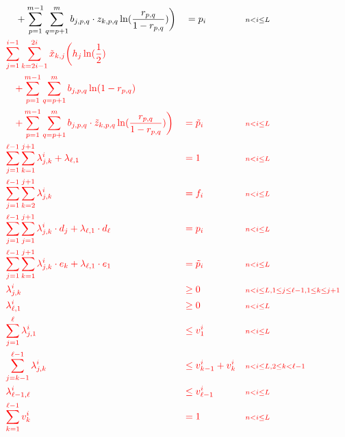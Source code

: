 \documentclass[runningheads]{llncs}
\newcommand{\HL}[1]{\textcolor{red}{#1}}
\begin{document}
\begin{align*}
                 & \quad + \sum_{p=1}^{m-1}\sum_{q=p+1}^m  b_{j,p,q} \cdot z_{k,p,q} \ln(\frac{r_{p,q}}{1-r_{p,q}}) \bigg) && = p_i && {\scriptstyle n < i \leq L}\\
                 & \HL{\sum^{i-1}_{j=1}\sum_{k=2i-1}^{2i}\tilde{x}_{k,j}\bigg(h_j\ln(\frac{1}{2})}\\
                 & \HL{\quad + \sum_{p=1}^{m-1}\sum_{q=p+1}^m b_{j,p,q}\ln(1-r_{p,q})}\\
                 & \HL{\quad + \sum_{p=1}^{m-1}\sum_{q=p+1}^m  b_{j,p,q} \cdot \tilde{z}_{k,p,q} \ln(\frac{r_{p,q}}{1-r_{p,q}}) \bigg)} && \HL{= \tilde{p}_i} && \HL{\scriptstyle n < i \leq L}\\
                 & \HL{\sum_{j=1}^{\ell-1} \sum_{k=1}^{j+1} \lambda^i_{j,k} + \lambda_{\ell,1}} && \HL{= 1}   && \HL{\scriptstyle n < i \leq L}\\
                 & \HL{\sum_{j=1}^{\ell-1} \sum_{k=2}^{j+1} \lambda^i_{j,k}}                    && \HL{= f_i} && \HL{\scriptstyle n < i \leq L}\\
                 & \HL{\sum_{j=1}^{\ell-1} \sum_{j=1}^{j+1} \lambda^i_{j,k} \cdot d_j + \lambda_{\ell,1} \cdot d_\ell} && \HL{= p_i}           && \HL{\scriptstyle n < i \leq L}\\
                 & \HL{\sum_{j=1}^{\ell-1} \sum_{k=1}^{j+1} \lambda^i_{j,k} \cdot e_k + \lambda_{\ell,1} \cdot e_1}    && \HL{= \tilde{p}_i}   && \HL{\scriptstyle n < i \leq L}\\
                 & \HL{\lambda^i_{j,k}}                                               && \HL{\geq 0}          && \HL{\scriptstyle n < i \leq L, 1 \leq j \leq \ell-1, 1 \leq k \leq j + 1}\\
                 & \HL{\lambda^i_{\ell,1}}                                            && \HL{\geq 0}          && \HL{\scriptstyle n < i \leq L}\\
                 & \HL{\sum_{j=1}^{\ell} \lambda^i_{j,1}}                             && \HL{\leq v^i_1}      && \HL{\scriptstyle n < i \leq L}\\
                 & \HL{\sum_{j=k-1}^{\ell-1} \lambda^i_{j,k}}                         && \HL{\leq v^i_{k-1} + v^i_k} && \HL{\scriptstyle n < i \leq L, 2 \leq k < \ell - 1}\\
                 & \HL{\lambda^i_{\ell-1,\ell}}                                       && \HL{\leq v^i_{\ell-1}}      && \HL{\scriptstyle n < i \leq L}\\
                 & \HL{\sum_{k=1}^{\ell-1} v^i_k}                                     && \HL{= 1}             && \HL{\scriptstyle n < i \leq L}\\

\end{align*}
\end{document}
